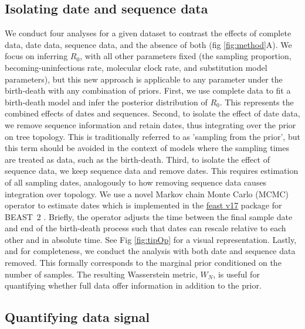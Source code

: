 \documentclass{article}
\begin{document}
\subsection*{Isolating date and sequence data}
We conduct four analyses for a given dataset to contrast the effects of complete data, date data, sequence data, and the absence of both (fig \ref{fig:method}A). We focus on inferring $R_{0}$, with all other parameters fixed (the sampling proportion, becoming-uninfectious rate, molecular clock rate, and substitution model parameters), but this new approach is applicable to any parameter under the birth-death with any combination of priors. First, we use complete data to fit a birth-death model and infer the posterior distribution of $R_{0}$. This represents the combined effects of dates and sequences. Second, to isolate the effect of date data, we remove sequence information and retain dates, thus integrating over the prior on tree topology. This is traditionally referred to as 'sampling from the prior', but this term should be avoided in the context of models where the sampling times are treated as data, such as the birth-death. Third, to isolate the effect of sequence data, we keep sequence data and remove dates. This requires estimation of all sampling dates, analogously to how removing sequence data causes integration over topology. We use a novel Markov chain Monte Carlo (MCMC) operator to estimate dates which is implemented in the \href{https://github.com/tgvaughan/feast}{feast v17} package for BEAST~2 \citep{bouckaert_beast_2019}. Briefly, the operator adjusts the time between the final sample date and end of the birth-death process such that dates can rescale relative to each other and in absolute time. See Fig \ref{fig:tipOp} for a visual representation. Lastly, and for completeness, we conduct the analysis with both date and sequence data removed. This formally corresponds to the marginal prior conditioned on the number of samples. The resulting Wasserstein metric, $W_N$, is useful for quantifying whether full data offer information in addition to the prior.
\subsection*{Quantifying data signal}
\end{document}

